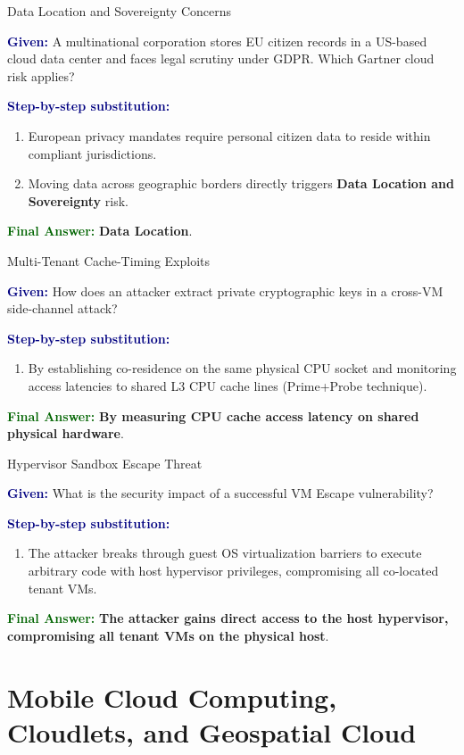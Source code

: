 \documentclass[11pt,a4paper,openany]{report}
\newcommand{\Given}{\par\textbf{\textcolor{navy}{Given:}} }
\newcommand{\Steps}{\par\textbf{\textcolor{navy}{Step-by-step substitution:}}\par}
\newcommand{\Answer}{\par\textbf{\textcolor{darkgreen}{Final Answer:}} }
\begin{document}
\begin{solved}{Data Location and Sovereignty Concerns}
\Given A multinational corporation stores EU citizen records in a US-based cloud data center and faces legal scrutiny under GDPR. Which Gartner cloud risk applies?
\Steps
\begin{enumerate}[leftmargin=*]
  \item European privacy mandates require personal citizen data to reside within compliant jurisdictions.
  \item Moving data across geographic borders directly triggers \textbf{Data Location and Sovereignty} risk.
\end{enumerate}
\Answer \textbf{Data Location}.
\end{solved}

\begin{solved}{Multi-Tenant Cache-Timing Exploits}
\Given How does an attacker extract private cryptographic keys in a cross-VM side-channel attack?
\Steps
\begin{enumerate}[leftmargin=*]
  \item By establishing co-residence on the same physical CPU socket and monitoring access latencies to shared L3 CPU cache lines (Prime+Probe technique).
\end{enumerate}
\Answer \textbf{By measuring CPU cache access latency on shared physical hardware}.
\end{solved}

\begin{solved}{Hypervisor Sandbox Escape Threat}
\Given What is the security impact of a successful VM Escape vulnerability?
\Steps
\begin{enumerate}[leftmargin=*]
  \item The attacker breaks through guest OS virtualization barriers to execute arbitrary code with host hypervisor privileges, compromising all co-located tenant VMs.
\end{enumerate}
\Answer \textbf{The attacker gains direct access to the host hypervisor, compromising all tenant VMs on the physical host}.
\end{solved}

\chapter{Mobile Cloud Computing, Cloudlets, and Geospatial Cloud}
\end{document}
